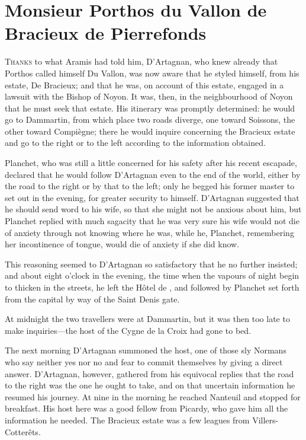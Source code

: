 \chapter{Monsieur Porthos du Vallon de Bracieux de Pierrefonds}

 \lettrine{T}{hanks} to what Aramis had told him, D'Artagnan, who knew already that Porthos called himself Du Vallon, was now aware that he styled himself, from his estate, De Bracieux; and that he was, on account of this estate, engaged in a lawsuit with the Bishop of Noyon. It was, then, in the neighbourhood of Noyon that he must seek that estate. His itinerary was promptly determined: he would go to Dammartin, from which place two roads diverge, one toward Soissons, the other toward Compiègne; there he would inquire concerning the Bracieux estate and go to the right or to the left according to the information obtained.

Planchet, who was still a little concerned for his safety after his recent escapade, declared that he would follow D'Artagnan even to the end of the world, either by the road to the right or by that to the left; only he begged his former master to set out in the evening, for greater security to himself. D'Artagnan suggested that he should send word to his wife, so that she might not be anxious about him, but Planchet replied with much sagacity that he was very sure his wife would not die of anxiety through not knowing where he was, while he, Planchet, remembering her incontinence of tongue, would die of anxiety if she did know.

This reasoning seemed to D'Artagnan so satisfactory that he no further insisted; and about eight o'clock in the evening, the time when the vapours of night begin to thicken in the streets, he left the Hôtel de , and followed by Planchet set forth from the capital by way of the Saint Denis gate.

At midnight the two travellers were at Dammartin, but it was then too late to make inquiries—the host of the Cygne de la Croix had gone to bed.

The next morning D'Artagnan summoned the host, one of those sly Normans who say neither yes nor no and fear to commit themselves by giving a direct answer. D'Artagnan, however, gathered from his equivocal replies that the road to the right was the one he ought to take, and on that uncertain information he resumed his journey. At nine in the morning he reached Nanteuil and stopped for breakfast. His host here was a good fellow from Picardy, who gave him all the information he needed. The Bracieux estate was a few leagues from Villers-Cotterêts.

